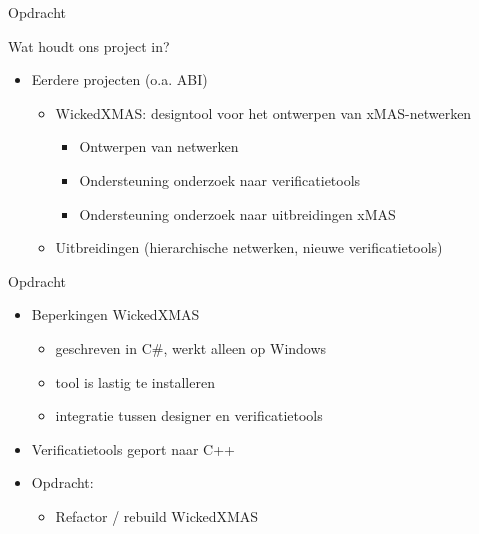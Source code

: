 \documentclass[10pt]{beamer}
\begin{document}
\begin{frame}[label=opdracht]{Opdracht}
 
\par{Wat houdt ons project in?}

\begin{itemize}

    \item Eerdere projecten (o.a. ABI)
    \begin{itemize}
        \item WickedXMAS: designtool voor het ontwerpen van xMAS-netwerken
        \begin{itemize}
         \item Ontwerpen van netwerken
         \item Ondersteuning onderzoek naar verificatietools
         \item Ondersteuning onderzoek naar uitbreidingen xMAS
        \end{itemize}

        \item Uitbreidingen (hierarchische netwerken, nieuwe verificatietools)
    \end{itemize}

\end{itemize}

 
\end{frame}

\begin{frame}{Opdracht}

\begin{itemize}
 \item Beperkingen WickedXMAS
 \begin{itemize}
  \item geschreven in C\#, werkt alleen op Windows
  \item tool is lastig te installeren
  \item integratie tussen designer en verificatietools
 \end{itemize}
 
 \item<2-> Verificatietools geport naar C++
 
 \item<2-> Opdracht:
 \begin{itemize}
  \item Refactor / rebuild WickedXMAS
 \end{itemize}


\end{itemize}

\end{frame}
\end{document}
